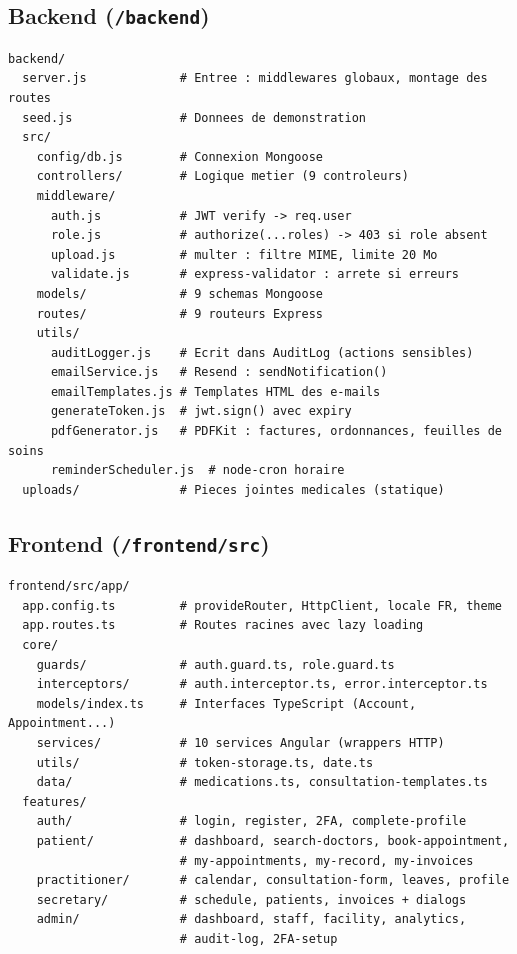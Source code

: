 \documentclass[12pt,a4paper]{report}
\begin{document}
\subsection{Backend (\texttt{/backend})}

\begin{lstlisting}[style=bash]
backend/
  server.js             # Entree : middlewares globaux, montage des routes
  seed.js               # Donnees de demonstration
  src/
    config/db.js        # Connexion Mongoose
    controllers/        # Logique metier (9 controleurs)
    middleware/
      auth.js           # JWT verify -> req.user
      role.js           # authorize(...roles) -> 403 si role absent
      upload.js         # multer : filtre MIME, limite 20 Mo
      validate.js       # express-validator : arrete si erreurs
    models/             # 9 schemas Mongoose
    routes/             # 9 routeurs Express
    utils/
      auditLogger.js    # Ecrit dans AuditLog (actions sensibles)
      emailService.js   # Resend : sendNotification()
      emailTemplates.js # Templates HTML des e-mails
      generateToken.js  # jwt.sign() avec expiry
      pdfGenerator.js   # PDFKit : factures, ordonnances, feuilles de soins
      reminderScheduler.js  # node-cron horaire
  uploads/              # Pieces jointes medicales (statique)
\end{lstlisting}

\subsection{Frontend (\texttt{/frontend/src})}

\begin{lstlisting}[style=bash]
frontend/src/app/
  app.config.ts         # provideRouter, HttpClient, locale FR, theme
  app.routes.ts         # Routes racines avec lazy loading
  core/
    guards/             # auth.guard.ts, role.guard.ts
    interceptors/       # auth.interceptor.ts, error.interceptor.ts
    models/index.ts     # Interfaces TypeScript (Account, Appointment...)
    services/           # 10 services Angular (wrappers HTTP)
    utils/              # token-storage.ts, date.ts
    data/               # medications.ts, consultation-templates.ts
  features/
    auth/               # login, register, 2FA, complete-profile
    patient/            # dashboard, search-doctors, book-appointment,
                        # my-appointments, my-record, my-invoices
    practitioner/       # calendar, consultation-form, leaves, profile
    secretary/          # schedule, patients, invoices + dialogs
    admin/              # dashboard, staff, facility, analytics,
                        # audit-log, 2FA-setup
\end{lstlisting}
\end{document}
